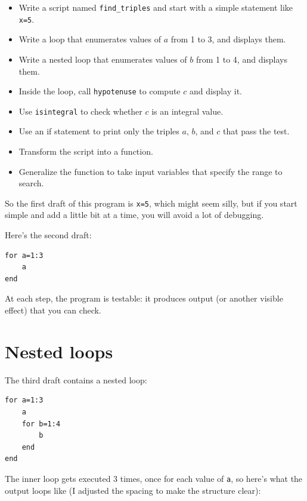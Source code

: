 \documentclass[
]{book}
\begin{document}
\begin{itemize}

\item Write a script named {\tt find\_triples} and start with a simple
statement like {\tt x=5}.

\item Write a loop that enumerates values of $a$ from 1 to 3, and
displays them.

\item Write a nested loop that enumerates values of $b$ from 1 to 4,
and displays them.

\item Inside the loop, call {\tt hypotenuse} to compute $c$ and
display it.

\item Use {\tt isintegral} to check whether $c$ is an integral
value.

\item Use an if statement to print only the triples $a$, $b$, and $c$
that pass the test.

\item Transform the script into a function.

\item Generalize the function to take input variables that
specify the range to search.

\end{itemize}

So the first draft of this program is {\tt x=5}, which might seem
silly, but if you start simple and add a little bit at a time, you
will avoid a lot of debugging.

Here's the second draft:

\begin{verbatim}
for a=1:3
    a
end
\end{verbatim}

At each step, the program is testable: it produces output (or another
visible effect) that you can check.


\section{Nested loops}

The third draft contains a nested loop:

\begin{verbatim}
for a=1:3
    a
    for b=1:4
        b
    end
end
\end{verbatim}

The inner loop gets executed 3 times, once for each value of {\tt a},
so here's what the output loops like (I adjusted the spacing to make
the structure clear):
\end{document}
